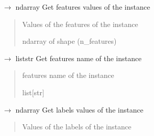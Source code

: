 \documentclass[letterpaper,10pt,english]{sphinxmanual}
\begin{document}
\begin{fulllineitems}
\begin{fulllineitems}
\label{\detokenize{data/_autosummary/miml.data.instance.Instance:miml.data.instance.Instance.get_features}}
\pysigstartsignatures
\pysiglinewithargsret
{}
{}
{{ $\rightarrow$ ndarray}}
\pysigstopsignatures
\sphinxAtStartPar
Get features values of the instance
\begin{quote}\begin{description}
\sphinxAtStartPar
{} \textendash{} Values of the features of the instance

\sphinxAtStartPar
ndarray of shape (n\_features)

\end{description}\end{quote}

\end{fulllineitems}


\begin{fulllineitems}
\label{\detokenize{data/_autosummary/miml.data.instance.Instance:miml.data.instance.Instance.get_features_name}}
\pysigstartsignatures
\pysiglinewithargsret
{}
{}
{{ $\rightarrow$ list\DUrole{p}{{[}}str\DUrole{p}{{]}}}}
\pysigstopsignatures
\sphinxAtStartPar
Get features name of the instance
\begin{quote}\begin{description}
\sphinxAtStartPar
{} \textendash{} features name of the instance

\sphinxAtStartPar
list{[}str{]}

\end{description}\end{quote}

\end{fulllineitems}


\begin{fulllineitems}
\label{\detokenize{data/_autosummary/miml.data.instance.Instance:miml.data.instance.Instance.get_labels}}
\pysigstartsignatures
\pysiglinewithargsret
{}
{}
{{ $\rightarrow$ ndarray}}
\pysigstopsignatures
\sphinxAtStartPar
Get labels values of the instance
\begin{quote}\begin{description}
\sphinxAtStartPar
{} \textendash{} Values of the labels of the instance


\end{description}
\end{quote}
\end{fulllineitems}
\end{fulllineitems}
\end{document}
